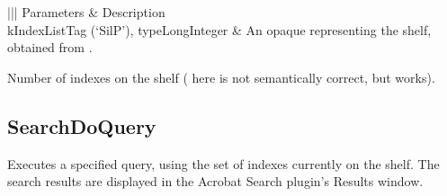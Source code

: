 \documentclass[letterpaper,12pt,english,openany,oneside]{sphinxmanual}
\begin{document}
\label{\detokenize{IAC_API_SearchIntro:apple-event-id-1}}

\begin{sphinxVerbatim}[commandchars=\\\{\}]
 
\end{sphinxVerbatim}
\label{\detokenize{IAC_API_SearchIntro:parameters-1}}


\begin{savenotes}\sphinxattablestart
\centering
{}\label{\detokenize{IAC_API_SearchIntro:section-6}}\nobreak
\begin{tabular}[t]{|||}
\hline
\sphinxstyletheadfamily 
Parameters
&\sphinxstyletheadfamily 
Description
\\
\hline
kIndexListTag (‘SilP’), typeLongInteger
&
An opaque  representing the shelf, obtained from  .
\\
\hline
\end{tabular}
\par
\sphinxattableend\end{savenotes}


\begin{sphinxVerbatim}[commandchars=\\\{\}]
  
\end{sphinxVerbatim}

Number of indexes on the shelf ( here is not semantically correct, but works).


\subsection{SearchDoQuery}
\label{\detokenize{IAC_API_SearchIntro:searchdoquery}}
Executes a specified query, using the set of indexes currently on the shelf. The search results are displayed in the Acrobat Search plug\sphinxhyphen{}in’s Results window.

\label{\detokenize{IAC_API_SearchIntro:apple-event-id-2}}
\end{document}
